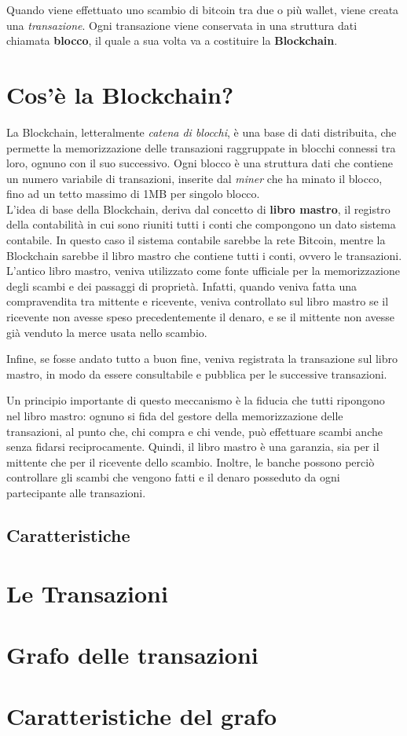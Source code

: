 Quando viene effettuato uno scambio di bitcoin tra due o più wallet, viene creata una \textit{transazione}. Ogni transazione viene conservata in una struttura dati chiamata \textbf{blocco}, il quale a sua volta va a costituire la \textbf{Blockchain}.

\section{Cos'è la Blockchain?}
La Blockchain, letteralmente \textit{catena di blocchi}, è una base di dati distribuita, che permette la memorizzazione delle transazioni raggruppate in blocchi connessi tra loro, ognuno con il suo successivo. Ogni blocco è una struttura dati che contiene un numero variabile di transazioni, inserite dal \textit{miner} che ha minato il blocco, fino ad un tetto massimo di 1MB per singolo blocco.\\

L'idea di base della Blockchain, deriva dal concetto di \textbf{libro mastro}, il registro della contabilità in cui sono riuniti tutti i conti che compongono un dato sistema contabile. In questo caso il sistema contabile sarebbe la rete Bitcoin, mentre la Blockchain sarebbe il libro mastro che contiene tutti i conti, ovvero le transazioni. \\

L'antico libro mastro, veniva utilizzato come fonte ufficiale per la memorizzazione degli scambi e dei passaggi di proprietà. Infatti, quando veniva fatta una compravendita tra mittente e ricevente, veniva controllato sul libro mastro se il ricevente non avesse speso precedentemente il denaro, e se il mittente non avesse già venduto la merce usata nello scambio.

Infine, se fosse andato tutto a buon fine, veniva registrata la transazione sul libro mastro, in modo da essere consultabile e pubblica per le successive transazioni.

Un principio importante di questo meccanismo è la fiducia che tutti ripongono nel libro mastro: ognuno si fida del gestore della memorizzazione delle transazioni, al punto che, chi compra e chi vende, può effettuare scambi anche senza fidarsi reciprocamente. Quindi, il libro mastro è una garanzia, sia per il mittente che per il ricevente dello scambio. Inoltre, le banche possono perciò controllare gli scambi che vengono fatti e il denaro posseduto da ogni partecipante alle transazioni.

\subsection{Caratteristiche}
\section{Le Transazioni}
\section{Grafo delle transazioni}
\section{Caratteristiche del grafo}
